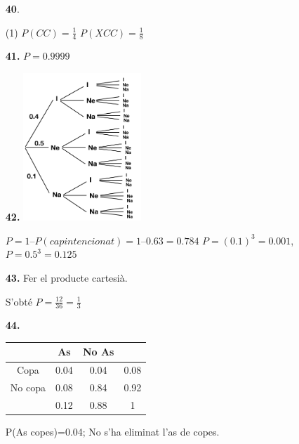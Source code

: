 \documentclass[a4paper, pdf, twoside]{book}
\begin{document}
\begin{multicols}{2}
\begin{enumerate}
 \item[\fontfamily{phv}\selectfont\color{blue}\textbf{40}. ] 
 \begin{tasks}[column-sep=1em, item-indent=1.3333em](1)
	 \task $P(CC)=\frac {1}{4}$
	 \task $P(XCC)=\frac {1}{8}$
\end{tasks}
 \end{enumerate}
\begin{enumerate}
\vspace{0.25cm}
\item[\fontfamily{phv}\selectfont\color{blue}\textbf{41. }]  \scalebox{0.6}{\simbolclau } 
$P=0.9999$
\vspace{0.25cm}
\item[\fontfamily{phv}\selectfont\color{blue}\textbf{42. }] 
\includegraphics [width=0.35\textwidth ]{img-sol/t4-42} \par \begin{tasks} \task $P=1 – P(cap intencionat) = 1 – 0.63 = 0.784$ \task $P=(0.1)^3=0.001$, $P=0.5^3=0.125$ \end{tasks}
\vspace{0.25cm}
\item[\fontfamily{phv}\selectfont\color{blue}\textbf{43. }] 
Fer el producte cartesià.\par S'obté $P=\frac {12}{36}=\frac {1}{3}$
\vspace{0.25cm}
\item[\fontfamily{phv}\selectfont\color{blue}\textbf{44. }] 
\begin {tabular}{c|ccc} & As & No As & \\ \hline Copa & 0.04 & 0.04 & 0.08 \\ No copa & 0.08 & 0.84 & 0.92 \\ & 0.12 & 0.88 & 1 \\ \end {tabular} \par P(As copes)=0.04; No s'ha eliminat l'as de copes.
\vspace{0.25cm}



\end{enumerate}
\end{multicols}
\end{document}
